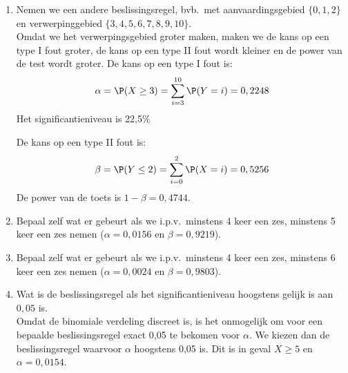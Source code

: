 {\begin{enumerate}
\begin{enumerate}
De kans op een type I fout is de kans dat de dobbelsteen als vals wordt beschouwd, terwijl hij eerlijk is. 
$$\alpha=\P(X\geq 4)=\sum_{i=4}^{10}\P(X=i)=0,0697$$
Het significantieniveau is 7,0\%

De kans op een type II fout is de  kans dat de dobbelsteen als eerlijk wordt beschouwd, terwijl hij eigenlijk vals is. 
$$\beta=\P(Y\leq 3)=0,776$$
De \textbf{power van de toets} is $1-\beta=0,224$. Dit is de kans dat we de nulhypothese verwerpen (dobbelsteen is eerlijk) als hij inderdaad vals is. 
\item Nemen we een andere beslissingsregel, bvb.\ met  aanvaardingsgebied  $\{0,1,2\}$ en  verwerpinggebied  $\{3,4,5,6,7,8,9,10\}$. \\
Omdat we het verwerpingsgebied groter maken, maken we de kans op een type I fout groter, de kans op een type II fout wordt kleiner  en de power van de test wordt groter. 
De kans op een type I fout is:
$$\alpha=\P(X\geq 3)=\sum_{i=3}^{10}\P(Y=i)=0,2248$$
Het significantieniveau is 22,5\%

De kans op een type II fout is:
$$\beta=\P(Y\leq 2)=\sum_{i=0}^2\P(X=i)=0,5256$$
De power van de toets is $1-\beta=0,4744$.
\item Bepaal zelf wat er gebeurt als we i.p.v.\ minstens 4 keer een zes, minstens 5 keer een zes nemen ($\alpha=0,0156$ en $\beta=0,9219$).
\item Bepaal zelf wat er gebeurt als we i.p.v.\ minstens 4 keer een zes, minstens 6 keer een zes nemen ($\alpha=0,0024$ en $\beta=0,9803$).
\item Wat is de beslissingsregel  als het significantieniveau hoogstens gelijk is aan $0,05$ is. \\
Omdat de binomiale verdeling discreet is, is het onmogelijk om voor een bepaalde beslissingsregel exact 0,05 te bekomen voor $\alpha$. We kiezen dan de beslissingsregel waarvoor $\alpha$ hoogstens 0,05 is. Dit is in geval $X\geq 5$ en $\alpha=0,0154$.


\end{enumerate}
\end{enumerate}}
